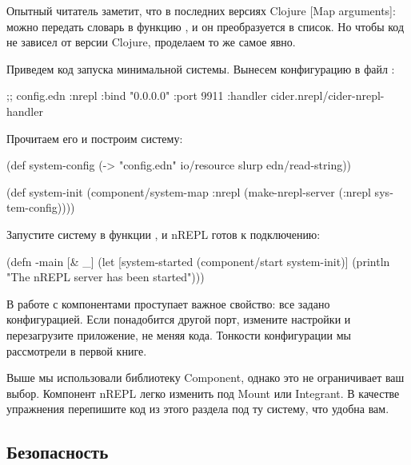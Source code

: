 Опытный читатель заметит, что в последних версиях Clojure [Map ar\-gu\-ments]: можно передать словарь в функцию , и он преобразуется в список. Но чтобы код не зависел от версии Clojure, проделаем то же самое явно.

Приведем код запуска минимальной системы. Вынесем конфигурацию в файл :

\begin{english}
  \begin{clojure}
;; config.edn
{:nrepl {:bind "0.0.0.0"
         :port 9911
         :handler cider.nrepl/cider-nrepl-handler}}
  \end{clojure}
\end{english}

Прочитаем его и построим систему:

\begin{english}
  \begin{clojure}
(def system-config
  (-> "config.edn"
      io/resource
      slurp
      edn/read-string))

(def system-init
  (component/system-map
   :nrepl (make-nrepl-server (:nrepl system-config))))
  \end{clojure}
\end{english}

Запустите систему в функции  , и nREPL готов к подключению:

\begin{english}
  \begin{clojure}
(defn -main
  [& _]
  (let [system-started
        (component/start system-init)]
    (println "The nREPL server has been started")))
  \end{clojure}
\end{english}

В работе с компонентами проступает важное свойство: все задано конфигурацией. Если понадобится другой порт, измените настройки и перезагрузите приложение, не меняя кода. Тонкости конфигурации мы рассмотрели в первой книге.

Выше мы использовали библиотеку Component, однако это не ограничивает ваш выбор. Компонент nREPL легко изменить под Mount или Integrant. В качестве упражнения перепишите код из этого раздела под ту систему, что удобна вам.

\subsection{Безопасность}

